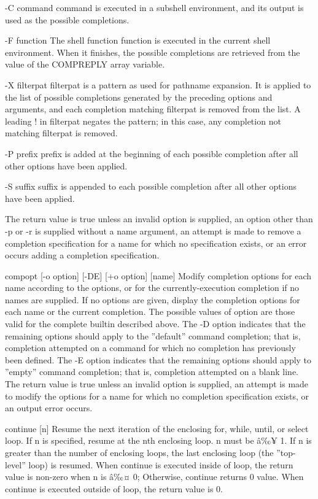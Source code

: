 -C command
command is executed in a subshell environment, and its output is used as the possible completions.

-F function
The shell function function is executed in the current shell environment. When it finishes, the possible completions are retrieved from the value of the COMPREPLY array variable.

-X filterpat
filterpat is a pattern as used for pathname expansion. It is applied to the list of possible completions generated by the preceding options and arguments, and each completion matching filterpat is removed from the list. A leading ! in filterpat negates the pattern; in this case, any completion not matching filterpat is removed.

-P prefix
prefix is added at the beginning of each possible completion after all other options have been applied.

-S suffix
suffix is appended to each possible completion after all other options have been applied.

The return value is true unless an invalid option is supplied, an option other than -p or -r is supplied without a name argument, an attempt is made to remove a completion specification for a name for which no specification exists, or an error occurs adding a completion specification.

compopt [-o option] [-DE] [+o option] [name]
Modify completion options for each name according to the options, or for the currently-execution completion if no names are supplied. If no options are given, display the completion options for each name or the current completion. The possible values of option are those valid for the complete builtin described above. The -D option indicates that the remaining options should apply to the ''default'' command completion; that is, completion attempted on a command for which no completion has previously been defined. The -E option indicates that the remaining options should apply to ''empty'' command completion; that is, completion attempted on a blank line.
The return value is true unless an invalid option is supplied, an attempt is made to modify the options for a name for which no completion specification exists, or an output error occurs.

continue [n]
Resume the next iteration of the enclosing for, while, until, or select loop. If n is specified, resume at the nth enclosing loop. n must be â‰¥ 1. If n is greater than the number of enclosing loops, the last enclosing loop (the ''top-level'' loop) is resumed. When continue is executed inside of loop, the return value is non-zero when n is â‰¤ 0; Otherwise, continue returns 0 value. When continue is executed outside of loop, the return value is 0.

